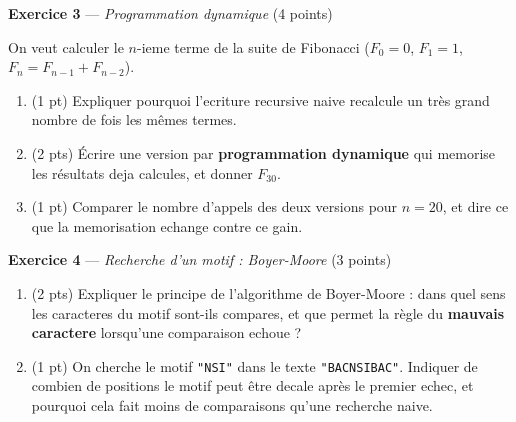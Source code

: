 \textbf{Exercice 3} --- \textit{Programmation dynamique} \hfill (4 points)

On veut calculer le $n$-ieme terme de la suite de Fibonacci ($F_0=0$, $F_1=1$,
$F_{n}=F_{n-1}+F_{n-2}$).

\begin{enumerate}
  \item (1 pt) Expliquer pourquoi l'ecriture recursive naive recalcule un très grand nombre
  de fois les mêmes termes.
  \item (2 pts) Écrire une version par \textbf{programmation dynamique} qui memorise les
  résultats deja calcules, et donner $F_{30}$.
  \item (1 pt) Comparer le nombre d'appels des deux versions pour $n=20$, et dire ce que la
  memorisation echange contre ce gain.
\end{enumerate}

%
%
%

\bigskip

\textbf{Exercice 4} --- \textit{Recherche d'un motif : Boyer-Moore} \hfill (3 points)

\begin{enumerate}
  \item (2 pts) Expliquer le principe de l'algorithme de Boyer-Moore : dans quel sens les
  caracteres du motif sont-ils compares, et que permet la règle du \textbf{mauvais
  caractere} lorsqu'une comparaison echoue ?
  \item (1 pt) On cherche le motif \lstinline{"NSI"} dans le texte
  \lstinline{"BACNSIBAC"}. Indiquer de combien de positions le motif peut être decale après
  le premier echec, et pourquoi cela fait moins de comparaisons qu'une recherche naive.
\end{enumerate}

